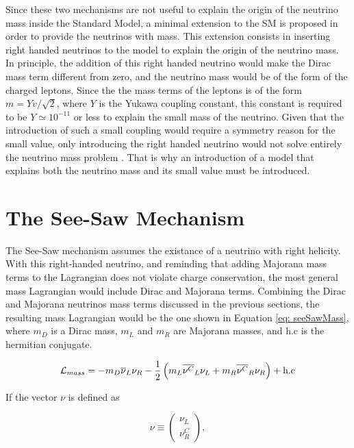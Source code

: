 Since these two mechanisms are not useful to explain the origin of the neutrino mass inside the Standard Model, a minimal extension to the SM is proposed in order to provide the neutrinos with mass. This extension consists in inserting right handed neutrinos to the model to explain the origin of the neutrino mass. In principle, the addition of this right handed neutrino would make the Dirac mass term different from zero, and the neutrino mass would be of the form of the charged leptons. Since the the mass terms of the leptons is of the form $m = Yv/\sqrt{2}$, where $Y$ is the Yukawa coupling constant, this constant is required to be $Y \simeq 10^{-11}$ or less to explain the small mass of the neutrino. Given that the introduction of such a small coupling would require a symmetry reason for the small value, only introducing the right handed neutrino would not solve entirely the neutrino mass problem \cite{YukawaCoupling}. That is why an introduction of a model that explains both the neutrino mass and its small value must be introduced.

\section{The See-Saw Mechanism}\label{sec: see-saw Theory}
 

The See-Saw mechanism assumes the existance of a neutrino with right helicity. With this right-handed neutrino, and reminding that adding Majorana mass terms to the Lagrangian does not violate charge conservation, the most general mass Lagrangian would include Dirac and Majorana terms. Combining the Dirac and Majorana neutrinos mass terms discussed in the previous sections, the resulting mass Lagrangian would be the one shown in Equation \ref{eq: seeSawMass}, where $m_{D}$ is a Dirac mass, $m_{L}$ and $m_{R}$ are Majorana masses, and h.c is the hermitian conjugate.

\begin{equation}\label{eq: seeSawMass}
\mathcal{L}_{mass} = -m_{D}\overline{\nu}_{L}\nu_{R} - \frac{1}{2}\left(m_{L}\overline{\nu^{C}}_{L}\nu_{L} + m_{R}\overline{\nu^{C}}_{R}\nu_{R}\right) + \text{h.c}
\end{equation}

If the vector $\nu$ is defined as

$$ \nu \equiv \begin{pmatrix} \nu_{L}\\ \nu^{C}_{R} \end{pmatrix} ,$$

